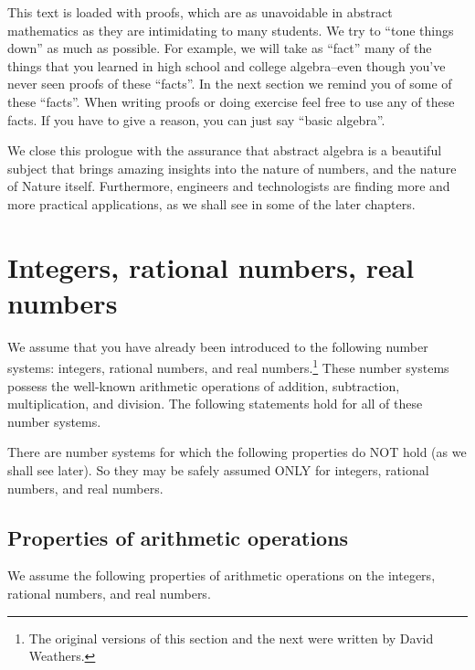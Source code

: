 This text is loaded with proofs, which are as unavoidable in abstract mathematics as they are intimidating to many students. We try to ``tone things down'' as much as possible. For example, we will take as ``fact'' many of the things that you learned in high school and  college algebra--even though you've never seen proofs of these ``facts''.  In the next section  we remind you of some of these ``facts''.  When writing proofs or doing exercise feel free to use any of these facts.  If you have to give a reason, you can just say  ``basic algebra''.

We close this prologue with the assurance that abstract algebra is a beautiful subject that brings amazing insights into the nature of numbers, and the nature of Nature itself. Furthermore, engineers and technologists are finding more and more practical applications, as we shall see in some of the later chapters.



\section {Integers, rational numbers, real numbers}



We assume that you have already been introduced to the following number systems: integers, rational numbers, and real numbers.\footnote{The original versions of this section and the next were written by David Weathers.}  These number systems possess the well-known arithmetic operations of addition, subtraction, multiplication, and division. The following statements hold for all of these number systems. 

\begin{warn}
There are number systems for which the following properties do NOT hold (as we shall see later). So they may be safely assumed ONLY for integers, rational numbers, and real numbers.
\end{warn}

\subsection{Properties of arithmetic operations}\label{OpsAndRels}

We assume the following properties of arithmetic operations on the integers, rational numbers, and real numbers.

